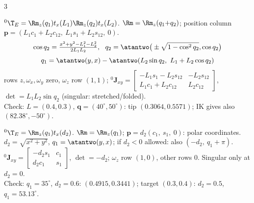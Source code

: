 \begin{multicols}{3}\raggedright
{}

\begin{fbx}
${}^0\T_E=\Rm_z(q_1)t_x(L_1)\Rm_z(q_2)t_x(L_2)$.
$\Rm=\Rm_z(q_1{+}q_2)$; position column $\mathbf p=(L_1c_1+L_2c_{12},\ L_1s_1+L_2s_{12},\ 0)$.
\[\cos q_2=\tfrac{x^2+y^2-L_1^2-L_2^2}{2L_1L_2},\ \ q_2=\atantwo\big(\pm\sqrt{1-\cos^2q_2},\cos q_2\big)\]
\[q_1=\atantwo(y,x)-\atantwo(L_2\sin q_2,\ L_1+L_2\cos q_2)\]
rows $z,\omega_x,\omega_y$ zero, $\omega_z$ row $(1,1)$; \quad${}^0\mathbf J_{xy}=\begin{bmatrix}-L_1s_1-L_2s_{12}&-L_2s_{12}\\L_1c_1+L_2c_{12}&L_2c_{12}\end{bmatrix}$, $\det=L_1L_2\sin q_2$ (singular: stretched/folded).\\
Check: $L=(0.4,0.3)$, $\mathbf q=(40^\circ,50^\circ)$: tip $(0.3064,0.5571)$; IK gives also $(82.38^\circ,-50^\circ)$. \chk
\end{fbx}

\begin{fbx}
${}^0\T_E=\Rm_z(q_1)t_x(d_2)$.
$\Rm=\Rm_z(q_1)$; $\mathbf p=d_2(c_1,\ s_1,\ 0)$: polar coordinates.
$d_2=\sqrt{x^2+y^2}$, $q_1=\atantwo(y,x)$; if $d_2<0$ allowed: also $(-d_2,\ q_1+\pi)$.
${}^0\mathbf J_{xy}=\begin{bmatrix}-d_2s_1&c_1\\d_2c_1&s_1\end{bmatrix}$, $\det=-d_2$; $\omega_z$ row $(1,0)$, other rows $0$. Singular only at $d_2=0$.\\
Check: $q_1=35^\circ$, $d_2=0.6$: $(0.4915,0.3441)$; target $(0.3,0.4)$: $d_2=0.5$, $q_1=53.13^\circ$. \chk
\end{fbx}


\end{multicols}
